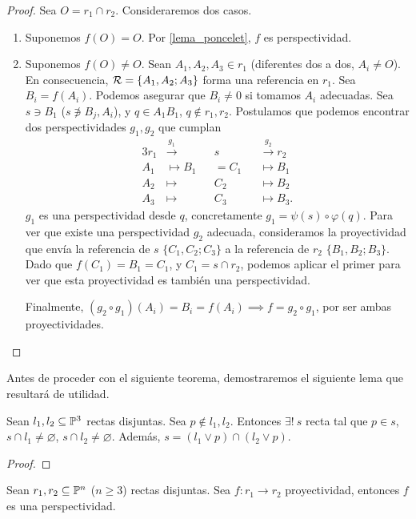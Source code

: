 \begin{proof} %
    Sea $O = r_1 \cap r_2$. Consideraremos dos casos.
    \begin{enumerate}
        \item Suponemos $f(O) = O$. Por \ref{lema_poncelet}, 
        $f$ es perspectividad.
        \item Suponemos $f(O) \neq O$. Sean $A_1, A_2, A_3 \in r_1$
        (diferentes dos a dos, $A_i \neq O$). En consecuencia,
        $\mathcal{R} = \{A_1, A_2; A_3\}$ forma una referencia en $r_1$.
        Sea $B_i = f(A_i)$. Podemos asegurar que $B_i \neq 0$
        si tomamos $A_i$ adecuadas. Sea $s \ni B_1$ ($ s 
        \not \ni B_j, A_i$), y $q \in A_1B_1$, $q \not
        \in r_1, r_2$. Postulamos que podemos encontrar
        dos perspectividades $g_1, g_2$ que cumplan
        \begin{alignat*}{3}
            r_1 &\stackrel{g_1}\longrightarrow &&s&&
            \stackrel{g_2}\longrightarrow r_2\\
            A_1 &\longmapsto B_1&&=C_1 &&\longmapsto B_1\\
            A_2 &\longmapsto &&C_2&&\longmapsto B_2\\
            A_3 &\longmapsto &&C_3&&\longmapsto B_3.
        \end{alignat*}
        $g_1$ es una perspectividad desde $q$, concretamente
        $g_1 = \psi(s) \circ \varphi(q)$. Para ver que existe
        una perspectividad $g_2$ adecuada, consideramos la
        proyectividad que envía la referencia de $s$
        $\{C_1, C_2; C_3\}$ a la referencia de $r_2$ $\{B_1,
        B_2; B_3\}$. Dado que $f(C_1) = B_1 = C_1$, y $C_1 = 
        s \cap r_2$, podemos aplicar el primer para ver que 
        esta proyectividad es también una perspectividad.
        
        Finalmente, $(g_2 \circ g_1)(A_i) = B_i = f(A_i) \implies
        f = g_2 \circ g_1$, por ser ambas proyectividades.
        
    \end{enumerate}
\end{proof}

Antes de proceder con el siguiente teorema, demostraremos
el siguiente lema que resultará de utilidad.

\begin{lema} %
    \label{lema_rectas_poncelet}
    Sean $l_1, l_2 \subseteq \mathbb{P}^3$ rectas disjuntas. Sea $p \not \in 
    l_1, l_2$. Entonces $\exists! \: s$ recta 
    tal que $p \in s$, $s \cap l_1 \neq \varnothing$, 
    $s \cap l_2 \neq \varnothing$. Además, $s = (l_1 \vee p) \cap 
    (l_2 \vee p)$.
\end{lema}
\begin{proof}
    
\end{proof}
\begin{teo*} %
    Sean $r_1, r_2 \subseteq \mathbb{P}^n$ ($n \geq 3$) rectas disjuntas.
    Sea $f \colon r_1 \to r_2$ proyectividad, entonces $f$
    es una perspectividad. 
\end{teo*}

